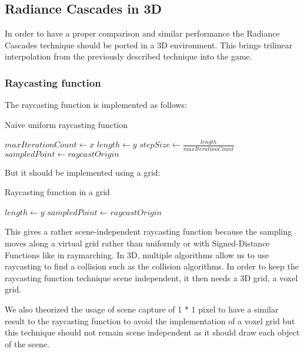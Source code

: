 \documentclass{rapportCS}
\begin{document}
\subsection{Radiance Cascades in 3D}
In order to have a proper comparison and similar performance the Radiance Cascades technique should be ported in a 3D environment. This brings trilinear interpolation from the previously described technique into the game.

\subsubsection{Raycasting function}
The raycasting function is implemented as follows:

\begin{algorithm}[hbt!]
\caption{Naive uniform raycasting function}\label{alg:two}
$maxIterationCount \gets x$\;
$length \gets y$\;
$stepSize \gets \frac{length}{maxIterationCount}$\;
$sampledPoint \gets raycastOrigin$\;
\end{algorithm}

But it should be implemented using a grid:

\begin{algorithm}[hbt!]
\caption{Raycasting function in a grid}\label{alg:two}
$length \gets y$\;
$sampledPoint \gets raycastOrigin$\;
\end{algorithm}

This gives a rather scene-independent raycasting function because the sampling moves along a virtual grid rather than uniformly or with Signed-Distance Functions like in raymarching.
In 3D, multiple algorithms allow us to use raycasting to find a collision such as the collision algorithms. In order to keep the raycasting function technique scene independent, it then needs a 3D grid, a voxel grid.

We also theorized the usage of scene capture of 1 * 1 pixel to have a similar result to the raycasting function to avoid the implementation of a voxel grid but this technique should not remain scene independent as it should draw each object of the scene.
\end{document}
